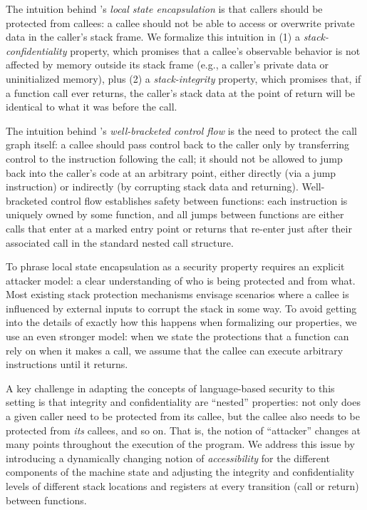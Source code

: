 \documentclass[acmsmall,review,anonymous]{acmart}\settopmatter{printfolios=true,printccs=false,printacmref=false}
\begin{document}
The intuition behind \citeauthor{Skorstengaard+19}'s {\em
  local state encapsulation} is that callers should be protected from
callees: a callee should not be able to access or overwrite private data
in the caller's stack frame.
%
We formalize this intuition in (1) a {\em stack-confidentiality}
property, which promises that a callee's observable behavior is not affected
by memory outside its stack frame (e.g., a caller's private data or
uninitialized memory), plus (2) a {\em stack-integrity} property,
which promises that, if a function call ever returns, the caller's stack
data at the point of return will be identical to what it was before the
call.

The intuition behind \citeauthor{Skorstengaard+19}'s {\em
  well-bracketed control flow} is the need to protect the call graph
itself: a callee should pass control back to the caller only by
transferring control to the instruction
following the call; it should not be allowed to jump back into the
caller's code at an arbitrary point, either directly (via a jump
instruction) or indirectly (by corrupting stack data and
returning). Well-bracketed control flow establishes safety between
functions: each instruction is uniquely owned by some function, and
all jumps between functions are either calls that enter at a marked
entry point or returns that re-enter just after their associated call
in the standard nested call structure.

To phrase local state encapsulation as a
security property requires an explicit attacker model: a clear
understanding of who is being protected and from what. Most existing
stack protection mechanisms envisage scenarios where a callee is
influenced by external inputs to corrupt the stack in some way. To
avoid getting into the details of exactly how this happens when
formalizing our properties, we use an even stronger model: when we
state the protections that a function can rely on when it makes a
call, we assume that the callee can execute arbitrary instructions
until it returns.

A key challenge in adapting the concepts of language-based security to this
setting is that integrity and confidentiality are ``nested'' properties: not
only does a given caller need to be protected from its callee, but the callee
also needs to be protected from {\em its} callees, and so on. That is, the notion
of ``attacker'' changes at many points throughout the execution of the program.
We address
this issue by introducing a dynamically changing notion of {\em accessibility} for
the different components of the machine state and adjusting the integrity
and confidentiality levels of different stack locations and registers at
every transition (call or return) between functions.
\end{document}
